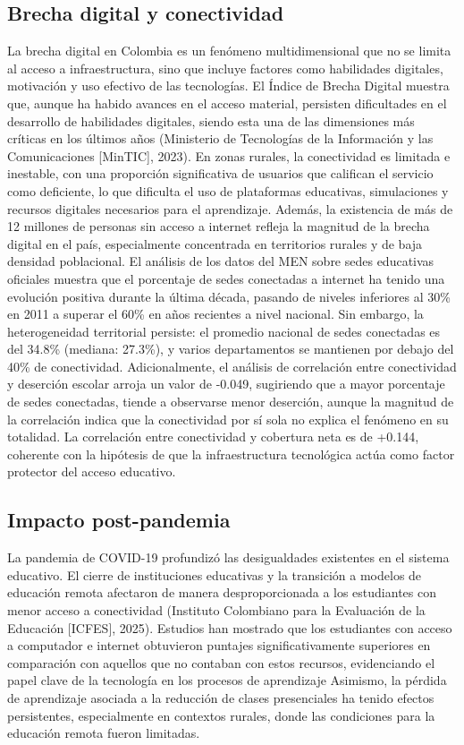\subsection{Brecha digital y conectividad}
La brecha digital en Colombia es un fenómeno multidimensional que no se limita al acceso a infraestructura, sino que incluye factores como habilidades digitales, motivación y uso efectivo de las tecnologías.
El Índice de Brecha Digital muestra que, aunque ha habido avances en el acceso material, persisten dificultades en el desarrollo de habilidades digitales, siendo esta una de las dimensiones más críticas en los últimos años (Ministerio de Tecnologías de la Información y las Comunicaciones [MinTIC], 2023).
En zonas rurales, la conectividad es limitada e inestable, con una proporción significativa de usuarios que califican el servicio como deficiente, lo que dificulta el uso de plataformas educativas, simulaciones y recursos digitales necesarios para el aprendizaje.
Además, la existencia de más de 12 millones de personas sin acceso a internet refleja la magnitud de la brecha digital en el país, especialmente concentrada en territorios rurales y de baja densidad poblacional.
El análisis de los datos del MEN sobre sedes educativas oficiales muestra que el porcentaje de sedes conectadas a internet ha tenido una evolución positiva durante la última década, pasando de niveles inferiores al 30\% en 2011 a superar el 60\% en años recientes a nivel nacional. Sin embargo, la heterogeneidad territorial persiste: el promedio nacional de sedes conectadas es del 34.8\% (mediana: 27.3\%), y varios departamentos se mantienen por debajo del 40\% de conectividad. Adicionalmente, el análisis de correlación entre conectividad y deserción escolar arroja un valor de -0.049, sugiriendo que a mayor porcentaje de sedes conectadas, tiende a observarse menor deserción, aunque la magnitud de la correlación indica que la conectividad por sí sola no explica el fenómeno en su totalidad. La correlación entre conectividad y cobertura neta es de +0.144, coherente con la hipótesis de que la infraestructura tecnológica actúa como factor protector del acceso educativo.
\subsection{Impacto post-pandemia}
La pandemia de COVID-19 profundizó las desigualdades existentes en el sistema educativo. El cierre de instituciones educativas y la transición a modelos de educación remota afectaron de manera desproporcionada a los estudiantes con menor acceso a conectividad (Instituto Colombiano para la Evaluación de la Educación [ICFES], 2025).
Estudios han mostrado que los estudiantes con acceso a computador e internet obtuvieron puntajes significativamente superiores en comparación con aquellos que no contaban con estos recursos, evidenciando el papel clave de la tecnología en los procesos de aprendizaje
Asimismo, la pérdida de aprendizaje asociada a la reducción de clases presenciales ha tenido efectos persistentes, especialmente en contextos rurales, donde las condiciones para la educación remota fueron limitadas.
